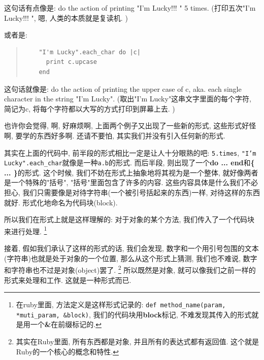 这句话有点像是: do the action of printing "I'm Lucky!!! " 5 times. (打印五次"I'm Lucky!!! ", 嗯, 人类的本质就是复读机. )

或者是: 

\begin{quotation}
  \begin{verbatim}
    "I'm Lucky".each_char do |c|
      print c.upcase
    end
  \end{verbatim}
\end{quotation}

这句话就像是: do the action of printing the upper case of c, aka. each single character in the string "I'm Lucky". (取出"I'm Lucky"这串文字里面的每个字符, 简记为c, 将每个字符都以大写的方式打印到屏幕上去. )

也许你会觉得, 啊, 好麻烦啊, 上面两个例子又出现了一些新的形式, 这些形式好怪啊, 要学的东西好多啊. 还请不要怕, 其实我们并没有引入任何新的形式. 

其实在上面的代码中, 前半段的形式相比一定是让人十分眼熟的吧: \texttt{5.times}, \texttt{"I'm Lucky".each_char}就像是一种\texttt{a.b}的形式. 而后半段, 则出现了一个\textbf{do ... end}和\textbf{\{ ... \}}的形式. 这个时候, 我们不妨在形式上抽象地将其视为是一个整体, 就好像两者是一个特殊的"括号", "括号"里面包含了许多的内容. 这些内容具体是什么我们不必担心, 我们只需要像是对待字符串(一个被引号括起来的东西)一样, 对待这样的东西就好. 形式化地命名为代码块(block).


所以我们在形式上就是这样理解的: 对于对象的某个方法, 我们传入了一个代码块来进行处理. \footnote{在ruby里面, 方法定义是这样形式记录的: \texttt{def method_name(param, *muti_param, &block)}, 我们的代码块用\textbf{block}标记, 不难发现其传入的形式就是用一个\textbf{\&}在前缀标记的. }

接着, 假如我们承认了这样的形式的话, 我们会发现, 数字和一个用引号包围的文本(字符串)也就是处于对象的一个位置, 那么从这个形式上猜测, 我们也不难说, 数字和字符串也不过是对象(object)罢了. \footnote{其实在Ruby里面, 所有东西都是对象, 并且所有的表达式都有返回值. 这个就是Ruby的一个核心的概念和特性. } 所以既然是对象, 就可以像我们之前一样的形式来处理和工作. 这就是一种形式而已. 

